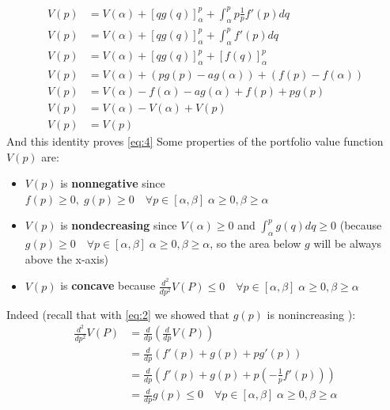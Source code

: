 \documentclass[12pt]{article}
\begin{document}
\begin{align*}
    V(p) & =V(\alpha) + [q g(q)]_{\alpha}^{p}  + \int_{\alpha}^p p \frac{1}{p}f'(p) dq \\
    V(p) & =V(\alpha) + [q g(q)]_{\alpha}^{p}  + \int_{\alpha}^p f'(p) dq              \\
    V(p) & =V(\alpha) + [q g(q)]_{\alpha}^{p}  + [f(q)]_{\alpha}^{p}                   \\
    V(p) & =V(\alpha) + (pg(p)-ag(\alpha))  + (f(p)-f(\alpha))                         \\
    V(p) & =V(\alpha)  -f(\alpha)-ag(\alpha)+f(p)+pg(p)                                \\
    V(p) & =V(\alpha)  -V(\alpha)+V(p)                                                 \\
    V(p) & =V(p)                                                                       
\end{align*}
\newpage
And this identity proves \eqref{eq:4}
\newline
Some properties of the portfolio value function $V(p)$ are:
\begin{itemize}
    \item $V(p)$ is \textbf{nonnegative} since $f(p)\geq 0, \; g(p)\geq 0 \quad \forall p\in[\alpha,\beta] \; \alpha\geq 0, \beta \geq \alpha$
    \item $V(p)$ is \textbf{nondecreasing} since $V(\alpha)\geq 0$ and $ \int_{\alpha}^p g(q) dq \geq 0$ \newline(because $g(p)\geq 0 \quad \forall p\in[\alpha,\beta] \; \alpha\geq 0, \beta \geq \alpha$, so the area below $g$ will be always above the x-axis)
    \item $V(p)$ is \textbf{concave} because $\frac{d^2}{dp^2}V(P)\leq 0 \quad \forall p\in[\alpha,\beta] \; \alpha\geq 0, \beta \geq \alpha$
\end{itemize}
Indeed (recall that with \eqref{eq:2} we showed that $g(p)$ is nonincreasing
):
\begin{align*}
    \frac{d^2}{dp^2}V(P) & =\frac{d}{dp} \left(\frac{d}{dp}V(P)\right)                                                   \\
                         & =\frac{d}{dp} \left(f'(p) +g(p) +pg'(p)\right)                                                \\
                         & =\frac{d}{dp} \left(f'(p) +g(p) +p\left(-\frac{1}{p}f'(p)\right) \right)                      \\
                         & =\frac{d}{dp} g(p) \leq 0 \quad \forall p\in[\alpha,\beta] \; \alpha\geq 0, \beta \geq \alpha 
\end{align*}
\end{document}
